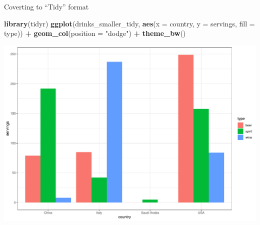 \documentclass[
  ignorenonframetext,
]{beamer}
\newenvironment{Shaded}{\begin{snugshade}}{\end{snugshade}}
\newcommand{\AttributeTok}[1]{\textcolor[rgb]{0.13,0.29,0.53}{#1}}
\newcommand{\FunctionTok}[1]{\textcolor[rgb]{0.13,0.29,0.53}{\textbf{#1}}}
\newcommand{\NormalTok}[1]{#1}
\newcommand{\SpecialCharTok}[1]{\textcolor[rgb]{0.81,0.36,0.00}{\textbf{#1}}}
\newcommand{\StringTok}[1]{\textcolor[rgb]{0.31,0.60,0.02}{#1}}
\begin{document}
\begin{frame}[fragile]{Coverting to ``Tidy'' format}
\protect\hypertarget{coverting-to-tidy-format-3}{}
\normalsize

\begin{Shaded}
\begin{Highlighting}[]
\FunctionTok{library}\NormalTok{(tidyr)}
\FunctionTok{ggplot}\NormalTok{(drinks\_smaller\_tidy, }\FunctionTok{aes}\NormalTok{(}\AttributeTok{x =}\NormalTok{ country, }\AttributeTok{y =}\NormalTok{ servings, }
                                \AttributeTok{fill =}\NormalTok{ type)) }\SpecialCharTok{+}
  \FunctionTok{geom\_col}\NormalTok{(}\AttributeTok{position =} \StringTok{"dodge"}\NormalTok{) }\SpecialCharTok{+} 
  \FunctionTok{theme\_bw}\NormalTok{()}
\end{Highlighting}
\end{Shaded}

\begin{center}\includegraphics[width=0.6\linewidth,height=0.45\textheight]{Week3_Lect_files/figure-beamer/unnamed-chunk-54-1} \end{center}
\normalsize
\end{frame}
\end{document}
